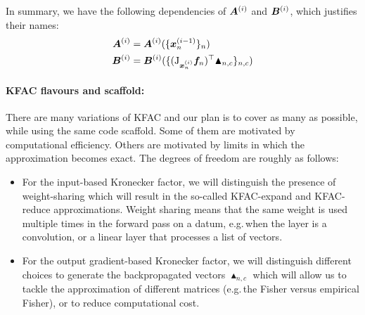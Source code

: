 In summary, we have the following dependencies of ${\bm{A}}^{(i)}$ and ${\bm{B}}^{(i)}$, which justifies their names:
\begin{align*}
  {\bm{A}}^{(i)} &= {\bm{A}}^{(i)}( \{{\bm{x}}_{n}^{(i-1)}\}_n )
  \\
  {\bm{B}}^{(i)} &= {\bm{B}}^{(i)}( \{ (\mathrm{J}_{{\bm{x}}_n^{(i)}}{\bm{f}}_{n})^{\top} \blacktriangle_{n,c}\}_{n,c})
\end{align*}

\paragraph{KFAC flavours and scaffold:}
There are many variations of KFAC and our plan is to cover as many as possible, while using the same code scaffold.
Some of them are motivated by computational efficiency.
Others are motivated by limits in which the approximation becomes exact.
The degrees of freedom are roughly as follows:
\begin{itemize}
\item For the input-based Kronecker factor, we will distinguish the presence of weight-sharing which will result in the so-called KFAC-expand and KFAC-reduce approximations.
  Weight sharing means that the same weight is used multiple times in the forward pass on a datum, e.g.\,when the layer is a convolution, or a linear layer that processes a list of vectors.

\item For the output gradient-based Kronecker factor, we will distinguish different choices to generate the backpropagated vectors $\blacktriangle_{n,c}$ which will allow us to tackle the approximation of different matrices (e.g.\,the Fisher versus empirical Fisher), or to reduce computational cost.
\end{itemize}

